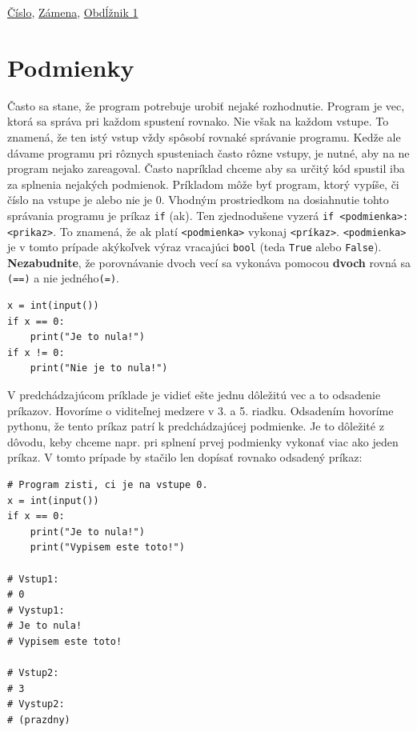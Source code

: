 \documentclass{article}
\begin{document}
\href{https://testovac.ksp.sk/tasks/ls-uvod-cislo/}{Číslo},
\href{https://testovac.ksp.sk/tasks/ls-uvod-zamena/}{Zámena},
\href{https://testovac.ksp.sk/tasks/ls-uvod-obdlznik1/}{Obdĺžnik 1}

\section{Podmienky}

Často sa stane, že program potrebuje urobiť nejaké rozhodnutie. Program je vec, ktorá sa správa pri každom spustení rovnako. Nie však na každom vstupe. To znamená, že ten istý vstup vždy spôsobí rovnaké správanie programu. Kedže ale dávame programu pri rôznych spusteniach často rôzne vstupy, je nutné, aby na ne program nejako zareagoval. Často napríklad chceme aby sa určitý kód spustil iba za splnenia nejakých podmienok. Príkladom môže byť program, ktorý vypíše, či číslo na vstupe je alebo nie je 0. Vhodným prostriedkom na dosiahnutie tohto správania programu je príkaz \texttt{if} (ak). Ten zjednodušene vyzerá \texttt{if <podmienka>: <prikaz>}. To znamená, že ak platí \texttt{<podmienka>}
vykonaj \texttt{<príkaz>}. \texttt{<podmienka>} je v tomto prípade akýkoľvek výraz vracajúci \texttt{bool} (teda \texttt{True} alebo \texttt{False}). \textbf{Nezabudnite}, že porovnávanie dvoch vecí sa vykonáva pomocou
\textbf{dvoch} rovná sa \texttt{(==)} a nie jedného\texttt{(=)}.

\begin{lstlisting}
x = int(input())
if x == 0:
    print("Je to nula!")
if x != 0:
    print("Nie je to nula!")
\end{lstlisting}

V predchádzajúcom príklade je vidieť ešte jednu dôležitú vec a to odsadenie príkazov. Hovoríme o viditeľnej medzere v 3. a 5. riadku. Odsadením hovoríme pythonu, že tento príkaz patrí k predchádzajúcej podmienke. Je to dôležité z dôvodu, keby chceme napr. pri splnení prvej podmienky vykonať viac ako jeden príkaz. V tomto prípade by stačilo len dopísať rovnako odsadený príkaz:

\begin{lstlisting}
# Program zisti, ci je na vstupe 0.
x = int(input())
if x == 0:
    print("Je to nula!")
    print("Vypisem este toto!")
    
# Vstup1:
# 0
# Vystup1:
# Je to nula!
# Vypisem este toto!

# Vstup2:
# 3
# Vystup2:
# (prazdny)
\end{lstlisting}
\end{document}

